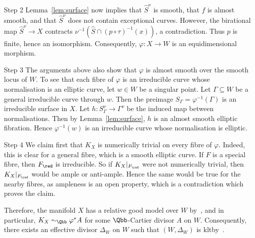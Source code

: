 \begin{proofc}
\begin{step}{Step 2}
Lemma~\ref{lem:surface} now implies that $\widehat S^\nu$ is smooth, that $f$ is almost smooth, and that $\widehat S^\nu$ does not contain exceptional curves. However, the birational map $\widehat S^\nu \to X$ contracts $\nu^{-1}(\widehat S\cap (p\circ\tau)^{-1}(x))$, a contradiction. Thus $p$ is finite, hence an isomorphism. Consequently, $\varphi\colon X \to W$ is an equidimensional morphism.
\end{step}

\begin{step}{Step 3}
The arguments above also show that $\varphi$ is almost smooth over the smooth locus of $W$. To see that each fibre of $\varphi$ is an irreducible curve whose normalisation is an elliptic curve, let $w \in W$ be a singular point. Let $\Gamma \subseteq W$ be a general irreducible curve through $w$. Then the preimage $S_\Gamma = \varphi^{-1}(\Gamma)$ is an irreducible surface in $X$. Let $h\colon S_\Gamma^\nu \to \Gamma^\nu$ be the induced map between normalisations. Then by Lemma~\ref{lem:surface}, $h$ is an almost smooth elliptic fibration. Hence $\varphi^{-1}(w)$ is an irreducible curve whose normalisation is elliptic.
\end{step}

\begin{laststep}{Step 4}
We claim first that $K_X$ is numerically trivial on every fibre of $\varphi$. Indeed, this is clear for a general fibre, which is a smooth elliptic curve. If $F$ is a special fibre, then $F_{\red}$ is irreducible. So if $K_X|_{F_{\red}}$ were not numerically trivial, then $K_X|_{F_{\red}}$ would be ample or anti-ample. Hence the same would be true for the nearby fibres, as ampleness is an open property, which is a contradiction which proves the claim.

Therefore, the manifold $X$ has a relative good model over $W$ by~\cite[Theorem~2.12]{HX13}, and in particular, $K_X\sim_\Qbb\varphi^*A$ for some $\Qbb$-Cartier divisor $A$ on $W$. Consequently, there exists an effective divisor $\Delta_W$ on $W$ such that $(W,\Delta_W)$ is klt\linebreak by~\cite[Theorem~0.2]{Amb05a}.
\end{laststep}
\let\qed\relax
\end{proofc}


